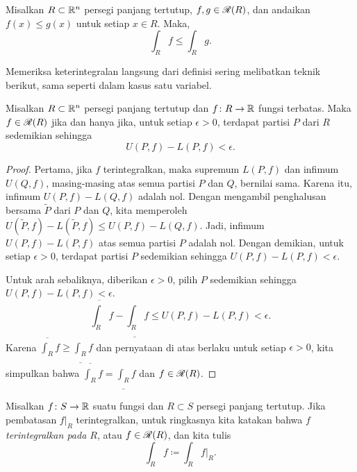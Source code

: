 \begin{prop}[Kemonotonan]
Misalkan $R \subset {\mathbb{R}}^n$ persegi panjang tertutup, $f,g \in {\mathscr{R}}(R)$, dan
andaikan $f(x) \leq g(x)$ untuk setiap $x \in R$. Maka,
\begin{equation*}
\int_R f 
\leq
\int_R g .
\end{equation*}
\end{prop}

Memeriksa keterintegralan langsung dari definisi sering melibatkan teknik
berikut, sama seperti dalam kasus satu variabel.

\begin{prop} \label{mv:prop:upperlowerepsilon}
Misalkan $R \subset {\mathbb{R}}^n$ persegi panjang tertutup dan
$f \colon R \to {\mathbb{R}}$ fungsi terbatas. Maka $f \in {\mathscr{R}}(R)$ jika dan hanya jika,
untuk setiap $\epsilon > 0$, terdapat partisi $P$ dari $R$ sedemikian sehingga
\begin{equation*}
U(P,f) - L(P,f) < \epsilon .
\end{equation*}
\end{prop}

\begin{proof}
Pertama, jika $f$ terintegralkan, maka supremum $L(P,f)$ dan infimum $U(Q,f)$,
masing-masing atas semua partisi $P$ dan $Q$, bernilai sama. Karena itu,
infimum $U(P,f)-L(Q,f)$ adalah nol. Dengan mengambil penghalusan bersama
$\widetilde{P}$ dari $P$ dan $Q$, kita memperoleh
$U(\widetilde{P},f)-L(\widetilde{P},f) \leq U(P,f)-L(Q,f)$.
Jadi, infimum $U(P,f)-L(P,f)$ atas semua partisi $P$ adalah nol. Dengan
demikian, untuk setiap $\epsilon > 0$, terdapat partisi $P$ sedemikian sehingga
$U(P,f) - L(P,f) < \epsilon$.

Untuk arah sebaliknya, diberikan $\epsilon > 0$, pilih $P$ sedemikian sehingga
$U(P,f) - L(P,f) < \epsilon$.
\begin{equation*}
\overline{\int_R} f - 
\underline{\int_R} f 
\leq
U(P,f) - L(P,f)
< \epsilon .
\end{equation*}
Karena $\overline{\int_R} f \geq \underline{\int_R} f$ dan pernyataan di atas
berlaku untuk setiap $\epsilon > 0$, kita simpulkan bahwa
$\overline{\int_R} f = \underline{\int_R} f$ dan $f \in {\mathscr{R}}(R)$.
\end{proof}

Misalkan $f \colon S \to {\mathbb{R}}$ suatu fungsi dan $R \subset S$ persegi panjang
tertutup. Jika pembatasan $f|_R$ terintegralkan, untuk ringkasnya kita katakan
bahwa $f$ \emph{terintegralkan pada $R$}, atau $f \in {\mathscr{R}}(R)$, dan kita tulis
\begin{equation*}
\int_R f \coloneqq \int_R f|_R .
\end{equation*}

